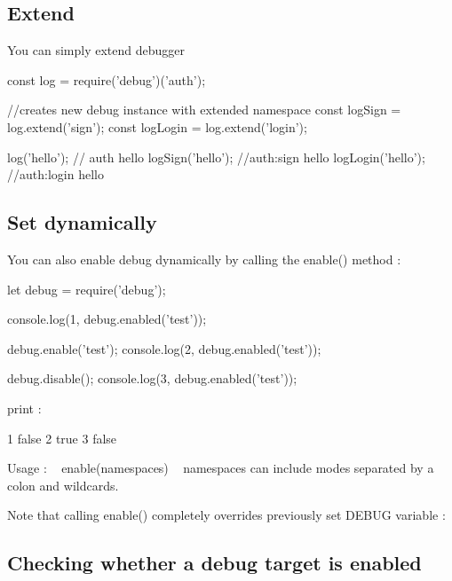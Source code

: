 \subsection*{Extend}

You can simply extend debugger 
\begin{DoxyCode}
const log = require('debug')('auth');

//creates new debug instance with extended namespace
const logSign = log.extend('sign');
const logLogin = log.extend('login');

log('hello'); // auth hello
logSign('hello'); //auth:sign hello
logLogin('hello'); //auth:login hello
\end{DoxyCode}


\subsection*{Set dynamically}

You can also enable debug dynamically by calling the {\ttfamily enable()} method \+:


\begin{DoxyCode}
let debug = require('debug');

console.log(1, debug.enabled('test'));

debug.enable('test');
console.log(2, debug.enabled('test'));

debug.disable();
console.log(3, debug.enabled('test'));
\end{DoxyCode}


print \+: 
\begin{DoxyCode}
1 false
2 true
3 false
\end{DoxyCode}


Usage \+: ~\newline
{\ttfamily enable(namespaces)} ~\newline
{\ttfamily namespaces} can include modes separated by a colon and wildcards.

Note that calling {\ttfamily enable()} completely overrides previously set D\+E\+B\+UG variable \+:




\subsection*{Checking whether a debug target is enabled}

